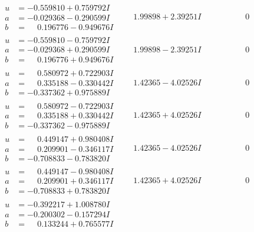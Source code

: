 \documentclass[1p]{elsarticle_modified}
\theoremstyle{definition}
\begin{document}
$$\begin{array}{c|c|c}
\begin{aligned}
u &= -0.559810 + 0.759792 I \\
a &= -0.029368 - 0.290599 I \\
b &= \phantom{-}0.196776 - 0.949676 I\end{aligned}
 & \phantom{-}1.99898 + 2.39251 I & \phantom{-0.000000 } 0 \\ \hline\begin{aligned}
u &= -0.559810 - 0.759792 I \\
a &= -0.029368 + 0.290599 I \\
b &= \phantom{-}0.196776 + 0.949676 I\end{aligned}
 & \phantom{-}1.99898 - 2.39251 I & \phantom{-0.000000 } 0 \\ \hline\begin{aligned}
u &= \phantom{-}0.580972 + 0.722903 I \\
a &= \phantom{-}0.335188 - 0.330442 I \\
b &= -0.337362 + 0.975889 I\end{aligned}
 & \phantom{-}1.42365 - 4.02526 I & \phantom{-0.000000 } 0 \\ \hline\begin{aligned}
u &= \phantom{-}0.580972 - 0.722903 I \\
a &= \phantom{-}0.335188 + 0.330442 I \\
b &= -0.337362 - 0.975889 I\end{aligned}
 & \phantom{-}1.42365 + 4.02526 I & \phantom{-0.000000 } 0 \\ \hline\begin{aligned}
u &= \phantom{-}0.449147 + 0.980408 I \\
a &= \phantom{-}0.209901 - 0.346117 I \\
b &= -0.708833 - 0.783820 I\end{aligned}
 & \phantom{-}1.42365 - 4.02526 I & \phantom{-0.000000 } 0 \\ \hline\begin{aligned}
u &= \phantom{-}0.449147 - 0.980408 I \\
a &= \phantom{-}0.209901 + 0.346117 I \\
b &= -0.708833 + 0.783820 I\end{aligned}
 & \phantom{-}1.42365 + 4.02526 I & \phantom{-0.000000 } 0 \\ \hline\begin{aligned}
u &= -0.392217 + 1.008780 I \\
a &= -0.200302 - 0.157294 I \\
b &= \phantom{-}0.133244 + 0.765577 I\end{aligned}

\end{array}$$
\end{document}
